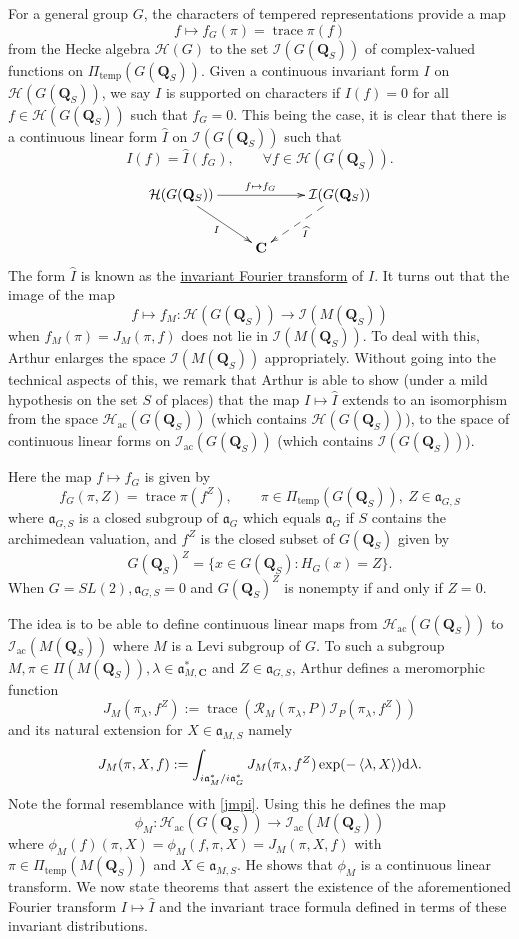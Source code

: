 \documentclass[11pt]{amsart}
\def\C{\mathbf C}
\def\Q{\mathbf Q}
\def\HHH{\mathcal H}
\def\III{\mathcal I}
\def\aaa{\mathfrak a}
\def\d{\text d}
\def\RRR{\mathcal R}
\def\sprod#1#2{\left\langle #1 , #2 \right\rangle}  %
\def\trace{\operatorname{trace}}
\theoremstyle{remark}
\begin{document}
For a general group $G$, the characters of tempered representations provide a map
\[ f \mapsto f_G(\pi) = \trace \pi(f) \]
from the Hecke algebra $\HHH(G)$ to the set $\III(G(\Q_S))$ of complex-valued functions on $\Pi_{\text{temp}}(G(\Q_S))$. Given a continuous invariant form $I$ on $\HHH(G(\Q_S))$, we say $I$ is supported on characters if $I(f) = 0$ for all $f \in \HHH(G(\Q_S))$ such that $f_G = 0$. This being the case, it is clear that there is a continuous linear form $\widehat I$ on $\III(G(\Q_S))$ such that 
\[ I(f) = \widehat I(f_G), \qquad \forall f \in \HHH(G(\Q_S)). \]
\[ \xymatrix{ \HHH(G(\Q_S)) \ar[rr]^{f \mapsto f_G} \ar[dr]_I && \III(G(\Q_S)) \ar@{-->}[dl]^{\widehat I} \\ & \C & }
\]
The form $\widehat I$ is known as the \underline{invariant Fourier transform} of $I$. It turns out that the image of the map
\[ f \mapsto f_M : \HHH(G(\Q_S)) \to \III(M(\Q_S)) \]
when $f_M(\pi) = J_M(\pi, f)$ does not lie in $\III(M(\Q_S))$. To deal with this, Arthur enlarges the space $\III(M(\Q_S))$ appropriately. Without going into the technical aspects of this, we remark that Arthur is able to show (under a mild hypothesis on the set $S$ of places) that the map $I \mapsto \widehat I$ extends to an isomorphism from the space $\HHH_{\text{ac}}(G(\Q_S))$ (which contains $\HHH(G(\Q_S))$), to the space of continuous linear forms on $\III_{\text{ac}}(G(\Q_S))$ (which contains $\III(G(\Q_S))$).

Here the map $f \mapsto f_G$ is given by
\[ f_G(\pi, Z) = \trace \pi(f^Z), \qquad \pi \in \Pi_{\text{temp}}(G(\Q_S)), \ Z \in \aaa_{G, S} \]
where $\aaa_{G, S}$ is a closed subgroup of $\aaa_G$ which equals $\aaa_G$ if $S$ contains the archimedean valuation, and $f^Z$ is the closed subset of $G(\Q_S)$ given by
\[ G(\Q_S)^Z = \{ x \in G(\Q_S) : H_G(x) = Z \}. \]
When $G = SL(2), \aaa_{G, S} = 0$ and $G(\Q_S)^Z$ is nonempty if and only if $Z = 0$. 

The idea is to be able to define continuous linear maps from $\HHH_{\text{ac}}(G(\Q_S))$ to $\III_{\text{ac}}(M(\Q_S))$ where $M$ is a Levi subgroup of $G$. To such a subgroup $M, \pi \in \Pi(M(\Q_S)), \lambda \in \aaa_{M, \C}^*$ and $Z \in \aaa_{G, S}$, Arthur defines a meromorphic function
\begin{equation} \label{eq:jmpi}
J_M(\pi_\lambda, f^Z) := \trace \left( \RRR_M(\pi_\lambda, P) \III_P(\pi_\lambda, f^Z) \right)
\end{equation}
and its natural extension for $X \in \aaa_{M, S}$ namely
\[ J_M(\pi, X, f) := \int_{i\aaa_M^* / i\aaa_G^*} J_M(\pi_\lambda, f^Z) \exp(-\sprod{\lambda}{X}) \d \lambda. \]
Note the formal resemblance with \cref{jmpi}. Using this he defines the map
\[ \phi_M : \HHH_{\text{ac}}(G(\Q_S)) \to \III_{\text{ac}}(M(\Q_S)) \]
where $\phi_M(f)(\pi, X) = \phi_M(f, \pi, X) = J_M(\pi, X, f)$ with $\pi \in \Pi_{\text{temp}}(M(\Q_S))$ and $X \in \aaa_{M, S}$. He shows \cite{MR999488} that $\phi_M$ is a continuous linear transform. We now state theorems that assert the existence of the aforementioned Fourier transform $I \mapsto \widehat I$ and the invariant trace formula defined in terms of these invariant distributions. 
\end{document}
